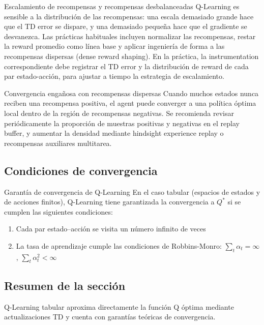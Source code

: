 \begin{importantbox}{Escalamiento de recompensas y recompensas desbalanceadas}
Q-Learning es sensible a la distribución de las recompensas: una escala demasiado grande hace que el TD error se dispare, y una demasiado pequeña hace que el gradiente se desvanezca. Las prácticas habituales incluyen normalizar las recompensas, restar la reward promedio como línea base y aplicar ingeniería de forma a las recompensas dispersas (dense reward shaping). En la práctica, la instrumentation correspondiente debe registrar el TD error y la distribución de reward de cada par estado-acción, para ajustar a tiempo la estrategia de escalamiento.
\end{importantbox}

\begin{warningbox}{Convergencia engañosa con recompensas dispersas}
Cuando muchos estados nunca reciben una recompensa positiva, el agent puede converger a una política óptima local dentro de la región de recompensas negativas. Se recomienda revisar periódicamente la proporción de muestras positivas y negativas en el replay buffer, y aumentar la densidad mediante hindsight experience replay o recompensas auxiliares multitarea.
\end{warningbox}

\subsection{Condiciones de convergencia}

\begin{importantbox}{Garantía de convergencia de Q-Learning}
En el caso tabular (espacios de estados y de acciones finitos), Q-Learning tiene garantizada la convergencia a $Q^*$ si se cumplen las siguientes condiciones:
\begin{enumerate}
    \item Cada par estado--acción se visita un número infinito de veces
    \item La tasa de aprendizaje cumple las condiciones de Robbins-Monro: $\sum_t \alpha_t = \infty$, $\sum_t \alpha_t^2 < \infty$
\end{enumerate}
\end{importantbox}

\subsection{Resumen de la sección}

Q-Learning tabular aproxima directamente la función Q óptima mediante actualizaciones TD y cuenta con garantías teóricas de convergencia.

